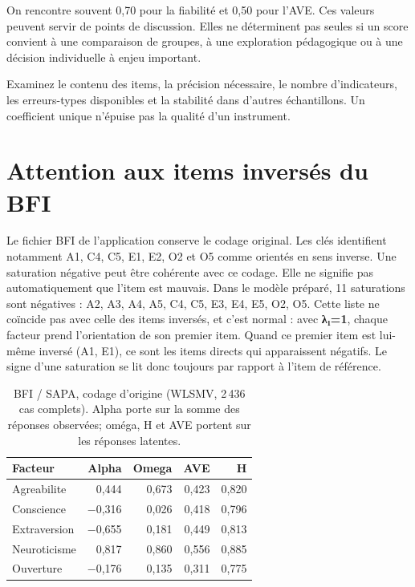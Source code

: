 \documentclass[
  french,
  11pt,
  a4paper,
  DIV=11,
  numbers=noendperiod]{scrreprt}
\begin{document}
On rencontre souvent 0,70 pour la fiabilité et 0,50 pour l'AVE. Ces
valeurs peuvent servir de points de discussion. Elles ne déterminent pas
seules si un score convient à une comparaison de groupes, à une
exploration pédagogique ou à une décision individuelle à enjeu
important.

Examinez le contenu des items, la précision nécessaire, le nombre
d'indicateurs, les erreurs-types disponibles et la stabilité dans
d'autres échantillons. Un coefficient unique n'épuise pas la qualité
d'un instrument.

\section{Attention aux items inversés du
BFI}\label{attention-aux-items-inversuxe9s-du-bfi}

Le fichier BFI de l'application conserve le codage original. Les clés
identifient notamment A1, C4, C5, E1, E2, O2 et O5 comme orientés en
sens inverse. Une saturation négative peut être cohérente avec ce
codage. Elle ne signifie pas automatiquement que l'item est mauvais.
Dans le modèle préparé, 11 saturations sont négatives : A2, A3, A4, A5,
C4, C5, E3, E4, E5, O2, O5. Cette liste ne coïncide pas avec celle des
items inversés, et c'est normal : avec \textbf{λ₁=1}, chaque facteur
prend l'orientation de son premier item. Quand ce premier item est
lui-même inversé (A1, E1), ce sont les items directs qui apparaissent
négatifs. Le signe d'une saturation se lit donc toujours par rapport à
l'item de référence.


{

\begin{longtable}[]{@{}lrrrr@{}}

\caption{\label{tbl-bfi-fiab}BFI / SAPA, codage d'origine (WLSMV, 2\,436
cas complets). Alpha porte sur la somme des réponses observées; oméga, H
et AVE portent sur les réponses latentes.}

\tabularnewline

\toprule\noalign{}
Facteur & Alpha & Omega & AVE & H \\
\midrule\noalign{}
\endhead
\bottomrule\noalign{}
\endlastfoot
Agreabilite & 0,444 & 0,673 & 0,423 & 0,820 \\
Conscience & −0,316 & 0,026 & 0,418 & 0,796 \\
Extraversion & −0,655 & 0,181 & 0,449 & 0,813 \\
Neuroticisme & 0,817 & 0,860 & 0,556 & 0,885 \\
Ouverture & −0,176 & 0,135 & 0,311 & 0,775 \\

\end{longtable}

}
\end{document}

